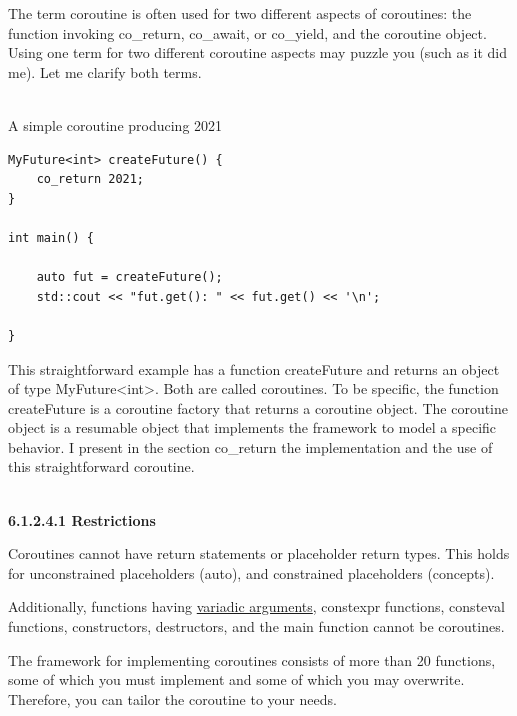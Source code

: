 \begin{tcolorbox}[colback=red!5!white,colframe=red!75!black,title={Distinguish Between the Coroutine Factory and the Coroutine Object}]
	
The term coroutine is often used for two different aspects of coroutines: the function invoking co\_return, co\_await, or co\_yield, and the coroutine object. Using one term for two different coroutine aspects may puzzle you (such as it did me). Let me clarify both terms.

\hspace*{\fill} \\ %
\noindent
A simple coroutine producing 2021
\begin{lstlisting}[style=styleCXX]
MyFuture<int> createFuture() {
	co_return 2021;
}

int main() {
	
	auto fut = createFuture();
	std::cout << "fut.get(): " << fut.get() << '\n';
	
}
\end{lstlisting}

This straightforward example has a function createFuture and returns an object of type MyFuture<int>. Both are called coroutines. To be specific, the function createFuture is a coroutine factory that returns a coroutine object. The coroutine object is a resumable object that implements the framework to model a specific behavior. I present in the section co\_return the implementation and the use of this straightforward coroutine.
	
\end{tcolorbox}

\hspace*{\fill} \\ %
\noindent
\textbf{6.1.2.4.1 \hspace{0.2cm} Restrictions}

Coroutines cannot have return statements or placeholder return types. This holds for unconstrained placeholders (auto), and constrained placeholders (concepts).

Additionally, functions having \href{https://en.cppreference.com/w/cpp/language/variadic_arguments}{variadic arguments}, constexpr functions, consteval functions, constructors, destructors, and the main function cannot be coroutines.


The framework for implementing coroutines consists of more than 20 functions, some of which you must implement and some of which you may overwrite. Therefore, you can tailor the coroutine to your needs.

